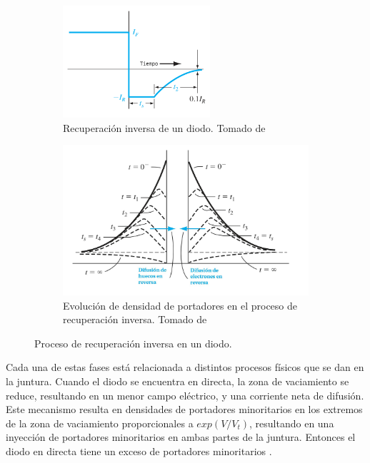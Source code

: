 \begin{figure}[t]
    \centering
    \begin{subfigure}[b]{0.45\textwidth}
        \centering
        \includegraphics[width=0.6\textwidth]{images/diode_reverse_recovery.png}
        \caption{Recuperación inversa de un diodo. Tomado de
        \cite{neamen2012semiconductor}}
        \label{fig:diode_reverse_recovery}
    \end{subfigure}
    \hfill
    \begin{subfigure}[b]{0.45\textwidth}
        \centering
        \includegraphics[width=\textwidth]{images/carrier_concentrations_turnoff.jpg}
        \caption{Evolución de densidad de portadores en el proceso de
        recuperación inversa. Tomado de \cite{neamen2012semiconductor}}
        \label{fig:carrier_concentrations_turnoff}
    \end{subfigure}
    \caption{Proceso de recuperación inversa en un diodo.}
    \label{fig:pn_reverse_recovery_plots}
\end{figure}

Cada una de estas fases está relacionada a distintos procesos físicos que se dan
en la juntura. Cuando el diodo se encuentra en directa, la zona de vaciamiento
se reduce, resultando en un menor campo eléctrico, y una corriente neta de
difusión. Este mecanismo resulta en densidades de portadores minoritarios en los
extremos de la zona de vaciamiento proporcionales a $exp(V/V_t)$, resultando en
una inyección de portadores minoritarios en ambas partes de la juntura. Entonces
el diodo en directa tiene un exceso de portadores minoritarios
\cite{neamen2012semiconductor}.

